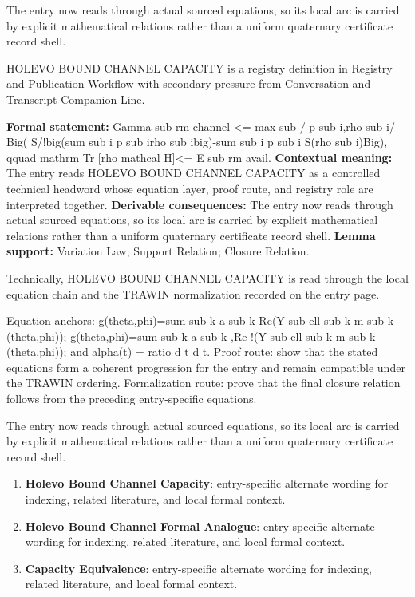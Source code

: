 The entry now reads through actual sourced equations, so its local arc is carried by explicit mathematical relations rather than a uniform quaternary certificate record shell.
\clearpage


\begingroup\small
{}
HOLEVO BOUND CHANNEL CAPACITY is a registry definition in Registry and Publication Workflow with secondary pressure from Conversation and Transcript Companion Line.

\begingroup\footnotesize\setlength{\emergencystretch}{3em}\sloppy
\textbf{Formal statement:} Gamma sub rm channel <= max sub / p sub i,rho sub i/ Big( S/!big(sum sub i p sub irho sub ibig)-sum sub i p sub i S(rho sub i)Big), qquad mathrm Tr [rho mathcal H]<= E sub rm avail. \textbf{Contextual meaning:} The entry reads HOLEVO BOUND CHANNEL CAPACITY as a controlled technical headword whose equation layer, proof route, and registry role are interpreted together. \textbf{Derivable consequences:} The entry now reads through actual sourced equations, so its local arc is carried by explicit mathematical relations rather than a uniform quaternary certificate record shell. \textbf{Lemma support:} Variation Law; Support Relation; Closure Relation.\par
\endgroup

Technically, HOLEVO BOUND CHANNEL CAPACITY is read through the local equation chain and the TRAWIN normalization recorded on the entry page.

Equation anchors: g(theta,phi)=sum sub k a sub k Re(Y sub ell sub k m sub k (theta,phi)); g(theta,phi)=sum sub k a sub k ,Re !(Y sub ell sub k m sub k (theta,phi)); and alpha(t) = ratio d t d t. Proof route: show that the stated equations form a coherent progression for the entry and remain compatible under the TRAWIN ordering. Formalization route: prove that the final closure relation follows from the preceding entry-specific equations.

The entry now reads through actual sourced equations, so its local arc is carried by explicit mathematical relations rather than a uniform quaternary certificate record shell.
\endgroup

\begin{enumerate}[leftmargin=1.6em,itemsep=6pt,topsep=4pt]
\item \textbf{Holevo Bound Channel Capacity}: entry-specific alternate wording for indexing, related literature, and local formal context.
\item \textbf{Holevo Bound Channel Formal Analogue}: entry-specific alternate wording for indexing, related literature, and local formal context.
\item \textbf{Capacity Equivalence}: entry-specific alternate wording for indexing, related literature, and local formal context.
\end{enumerate}

